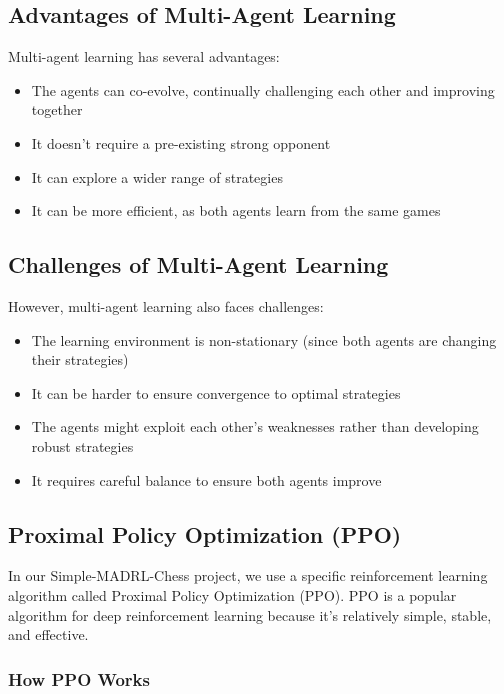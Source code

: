 \documentclass[11pt]{article}
\begin{document}
\subsection{Advantages of Multi-Agent Learning}

Multi-agent learning has several advantages:
\begin{itemize}
    \item The agents can co-evolve, continually challenging each other and improving together
    \item It doesn't require a pre-existing strong opponent
    \item It can explore a wider range of strategies
    \item It can be more efficient, as both agents learn from the same games
\end{itemize}

\subsection{Challenges of Multi-Agent Learning}

However, multi-agent learning also faces challenges:
\begin{itemize}
    \item The learning environment is non-stationary (since both agents are changing their strategies)
    \item It can be harder to ensure convergence to optimal strategies
    \item The agents might exploit each other's weaknesses rather than developing robust strategies
    \item It requires careful balance to ensure both agents improve
\end{itemize}

\subsection{Proximal Policy Optimization (PPO)}

In our Simple-MADRL-Chess project, we use a specific reinforcement learning algorithm called Proximal Policy Optimization (PPO). PPO is a popular algorithm for deep reinforcement learning because it's relatively simple, stable, and effective.

\subsubsection{How PPO Works}
\end{document}
